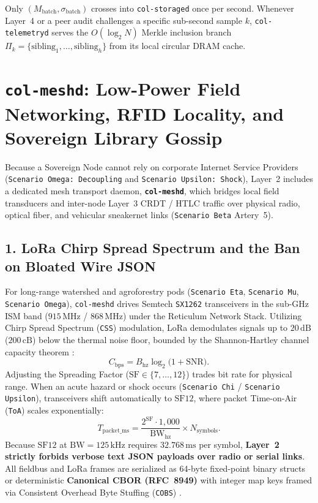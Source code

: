 Only $(M_{\mathrm{batch}}, \sigma_{\mathrm{batch}})$ crosses  into \texttt{col-storaged} once per second. Whenever Layer~4 or a peer audit challenges a specific sub-second sample $k$, \texttt{col-telemetryd} serves the $O(\log_2 N)$ Merkle inclusion branch $\Pi_k = \{\mathrm{sibling}_1,\dots,\mathrm{sibling}_h\}$ from its local circular DRAM cache.

\section{\texttt{col-meshd}: Low-Power Field Networking, RFID Locality, and Sovereign Library Gossip}
\label{sec:l2-col-meshd-networking}

Because a Sovereign Node cannot rely on corporate Internet Service Providers (\texttt{Scenario Omega: Decoupling} and \texttt{Scenario Upsilon: Shock}), Layer~2 includes a dedicated mesh transport daemon, \textbf{\texttt{col-meshd}}, which bridges local field transducers and inter-node Layer~3 CRDT / HTLC traffic over physical radio, optical fiber, and vehicular sneakernet links (\texttt{Scenario Beta} Artery~5).

\subsection{1. LoRa Chirp Spread Spectrum and the Ban on Bloated Wire JSON}

For long-range watershed and agroforestry pods (\texttt{Scenario Eta}, \texttt{Scenario Mu}, \texttt{Scenario Omega}), \texttt{col-meshd} drives Semtech \texttt{SX1262} transceivers in the sub-GHz ISM band ($915\,\mathrm{MHz}$ / $868\,\mathrm{MHz}$) under the Reticulum Network Stack. Utilizing Chirp Spread Spectrum (\texttt{CSS}) modulation, LoRa demodulates signals up to $20\,\mathrm{dB}$ ($200\,\mathrm{cB}$) below the thermal noise floor, bounded by the Shannon-Hartley channel capacity theorem \parencite{shannon1949communication}:
\begin{equation}
    C_{\mathrm{bps}} = B_{\mathrm{hz}} \log_2\bigl(1 + \mathrm{SNR}\bigr).
    \label{eq:l2-shannon-hartley}
\end{equation}
Adjusting the Spreading Factor ($\mathrm{SF} \in \{7,\dots,12\}$) trades bit rate for physical range. When an acute hazard or shock occurs (\texttt{Scenario Chi} / \texttt{Scenario Upsilon}), transceivers shift automatically to $\mathrm{SF12}$, where packet Time-on-Air (\texttt{ToA}) scales exponentially:
\begin{equation}
    T_{\mathrm{packet\_ms}} = \frac{2^{\mathrm{SF}}\cdot 1{,}000}{\mathrm{BW}_{\mathrm{hz}}} \times N_{\mathrm{symbols}}.
    \label{eq:l2-lora-toa}
\end{equation}
Because $\mathrm{SF12}$ at $\mathrm{BW} = 125\,\mathrm{kHz}$ requires $32.768\,\mathrm{ms}$ per symbol, \textbf{Layer~2 strictly forbids verbose text JSON payloads over radio or serial links}. All fieldbus and LoRa frames are serialized as 64-byte fixed-point binary structs or deterministic \textbf{Canonical CBOR (RFC~8949)} \parencite{rfc8949} with integer map keys framed via Consistent Overhead Byte Stuffing (\texttt{COBS}) \parencite{cheshire1999cobs}.

